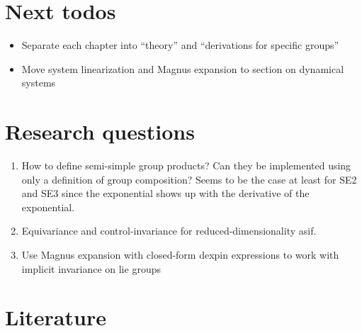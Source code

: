 

\section{Next todos}

\begin{itemize}
  \item Separate each chapter into ``theory'' and ``derivations for specific groups''
  \item Move system linearization and Magnus expansion to section on dynamical systems
\end{itemize}

\section{Research questions}

\begin{enumerate}
  \item How to define semi-simple group products? Can they be implemented using only a definition of group composition? Seems to be the case at least for SE2 and SE3 since the exponential shows up with the derivative of the exponential.
  \item Equivariance and control-invariance for reduced-dimensionality asif.
  \item Use Magnus expansion with closed-form dexpin expressions to work with implicit invariance on lie groups
\end{enumerate}


\section{Literature}

